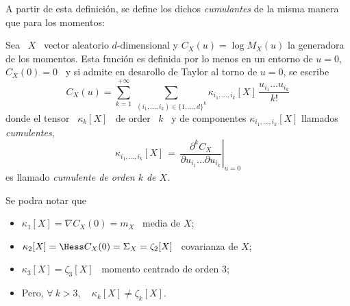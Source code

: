 {A partir de esta definici\'on, se define los dichos {\em cumulantes} de la misma
manera que para los momentos:
%
\begin{definicion}[Cumulantes]
  Sea  \ $X$  \ vector  aleatorio $d$-dimensional  y $C_X(u)  = \log  M_X(u)$ la
  generadora de  los momentos.  Esta funci\'on  es definida por  lo menos  en un
  entorno  de $u  = 0$,  $C_X(0)  = 0$  \ y  si  admite en  desarollo de  Taylor
  al torno de $u = 0$, se escribe
  \[
  C_X(u)     =    \sum_{k=1}^{+\infty}     \,     \sum_{(i_1,\ldots,i_k)    \in     \{1 , \ldots , d \}^k}
  \kappa_{i_1,\ldots,i_k}[X] \, \frac{u_{i_1} \ldots u_{i_k}}{k!}
  \]
  donde  el  tensor  \ $\kappa_k[X]$  \  de  order  \  $k$  \ y  de  componentes
  $\kappa_{i_1,\ldots,i_k}[X]$ llamados {\em cumulentes},
  \[
  \kappa_{i_1,\ldots,i_k}[X] \, = \, \left.\frac{\partial^k C_X}{\partial u_{i_1}
      \ldots \partial u_{i_k}} \right|_{u = 0}
  \]
  es llamado {\em cumulente de orden $k$ de $X$.}
\end{definicion}

Se podra notar que
%
\begin{itemize}
\item $\kappa_1[X] = \nabla C_X(0) = m_X$ \ media de $X$;
%
\item $\kappa_2[X] = \Hess C_X(0) = \Sigma_X = \zeta_2[X]$ \ covarianza de $X$;
%
\item $\kappa_3[X] = \zeta_3[X]$ \ momento centrado de orden 3;
%
\item Pero, $\forall \: k > 3, \quad \kappa_k[X] \ne \zeta_k[X]$.
\end{itemize}

}
